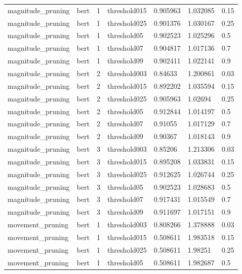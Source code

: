 \begin{tabular}{lllllll}
    magnitude\_pruning &  bert &   1 & threshold015 &  0.905963 &  1.032085 &   0.15 \\
    magnitude\_pruning &  bert &   1 & threshold025 &  0.901376 &  1.030167 &   0.25 \\
    magnitude\_pruning &  bert &   1 &  threshold05 &  0.902523 &  1.025296 &    0.5 \\
    magnitude\_pruning &  bert &   1 &  threshold07 &  0.904817 &  1.017136 &    0.7 \\
    magnitude\_pruning &  bert &   1 &  threshold09 &  0.902411 &  1.022141 &    0.9 \\
    magnitude\_pruning &  bert &   2 & threshold003 &   0.84633 &  1.200861 &   0.03 \\
    magnitude\_pruning &  bert &   2 & threshold015 &  0.892202 &  1.035594 &   0.15 \\
    magnitude\_pruning &  bert &   2 & threshold025 &  0.905963 &   1.02694 &   0.25 \\
    magnitude\_pruning &  bert &   2 &  threshold05 &  0.912844 &  1.014197 &    0.5 \\
    magnitude\_pruning &  bert &   2 &  threshold07 &   0.91055 &  1.017129 &    0.7 \\
    magnitude\_pruning &  bert &   2 &  threshold09 &   0.90367 &  1.018143 &    0.9 \\
    magnitude\_pruning &  bert &   3 & threshold003 &   0.85206 &  1.213306 &   0.03 \\
    magnitude\_pruning &  bert &   3 & threshold015 &  0.895208 &  1.033831 &   0.15 \\
    magnitude\_pruning &  bert &   3 & threshold025 &  0.912625 &  1.026744 &   0.25 \\
    magnitude\_pruning &  bert &   3 &  threshold05 &  0.902523 &  1.028683 &    0.5 \\
    magnitude\_pruning &  bert &   3 &  threshold07 &  0.917431 &  1.015549 &    0.7 \\
    magnitude\_pruning &  bert &   3 &  threshold09 &  0.911697 &  1.017151 &    0.9 \\
     movement\_pruning &  bert &   1 & threshold003 &  0.808266 &  1.378888 &   0.03 \\
     movement\_pruning &  bert &   1 & threshold015 &  0.508611 &  1.983518 &   0.15 \\
     movement\_pruning &  bert &   1 & threshold025 &  0.508611 &   1.98251 &   0.25 \\
     movement\_pruning &  bert &   1 &  threshold05 &  0.508611 &  1.982687 &    0.5 \\

\end{tabular}
